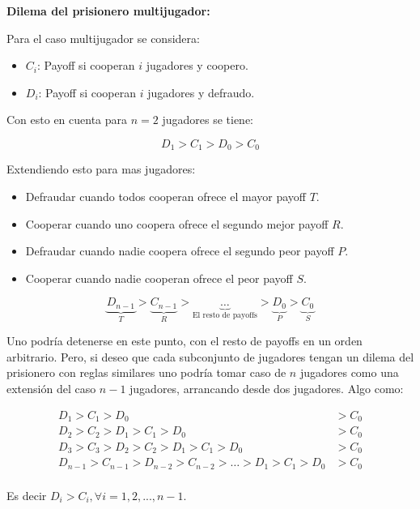 \documentclass[twocolumn,aps,prl]{revtex4-1}
\begin{document}
\textbf{Dilema del prisionero multijugador:}

Para el caso multijugador se considera:

\begin{itemize}
    \item $C_i$: Payoff si cooperan $i$ jugadores y coopero.
    \item $D_i$: Payoff si cooperan $i$ jugadores y defraudo.
\end{itemize}

Con esto en cuenta para $n=2$ jugadores se tiene:

$$
D_1 > C_1 > D_0 > C_0
$$

Extendiendo esto para mas jugadores:

\begin{itemize}
    \item Defraudar cuando todos cooperan ofrece el mayor payoff $T$.
    \item Cooperar cuando uno coopera ofrece el segundo mejor payoff $R$.
    \item Defraudar cuando nadie coopera ofrece el segundo peor payoff $P$.
    \item Cooperar cuando nadie cooperan ofrece el peor payoff $S$.
\end{itemize}

$$
  \underbrace{D_{n-1 }}_{T} 
> \underbrace{C_{n-1 }}_{R} 
> \underbrace{\ldots}_{\text{El resto de payoffs}} 
> \underbrace{D_{0 }}_{P}
> \underbrace{C_{0 }}_{S}
$$

Uno podría detenerse en este punto, con el resto de payoffs en un orden arbitrario. Pero, si deseo que cada subconjunto de jugadores tengan un dilema del prisionero con reglas similares uno podría tomar caso de $n$ jugadores como una extensión del caso $n-1$ jugadores, arrancando desde dos jugadores. Algo como:

$$
\begin{aligned}
  D_{1 }   > C_{1 }   > D_{0 }   &> C_{0 }    \\
  D_{2 }   > C_{2 }   > D_{1 }   > C_{1 }   > D_{0 } &> C_{0 }  \\
  D_{3 }   > C_{3 }   > D_{2 }   > C_{2 }   > D_{1 } > C_{1 } > D_{0 } &> C_{0 }  \\
  D_{n-1 } > C_{n-1 } > D_{n-2 } > C_{n-2 } > \ldots > D_{1 } > C_{1 } > D_{0 } &> C_{0 }\\
\end{aligned}
$$

Es decir $D_i > C_i, \forall i = 1, 2, ..., n-1$. 

% 
\end{document}
